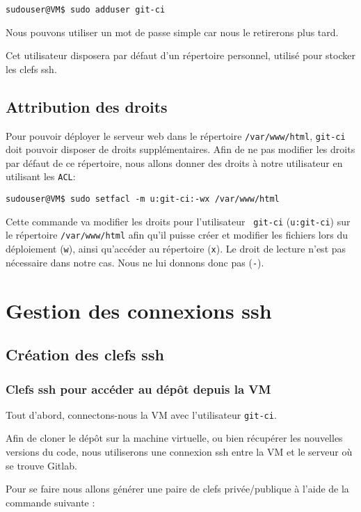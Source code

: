     \begin{verbatim}
sudouser@VM$ sudo adduser git-ci
    \end{verbatim}

Nous pouvons utiliser un mot de passe simple car nous le retirerons plus tard.

Cet utilisateur disposera par défaut d'un répertoire personnel, utilisé pour stocker les clefs ssh.

\subsection{Attribution des droits}
Pour pouvoir déployer le serveur web dans le répertoire \texttt{/var/www/html}, \texttt{git-ci} doit pouvoir disposer de droits supplémentaires.
Afin de ne pas modifier les droits par défaut de ce répertoire, nous allons donner des droits à notre utilisateur en utilisant les \texttt{ACL}:

    \begin{verbatim}
sudouser@VM$ sudo setfacl -m u:git-ci:-wx /var/www/html
    \end{verbatim}

Cette commande va modifier les droits pour l'utilisateur  \texttt{git-ci} (\texttt{u:git-ci}) sur le répertoire \texttt{/var/www/html} afin qu'il puisse créer et modifier les fichiers lors du déploiement (\texttt{w}), ainsi qu'accéder au répertoire (\texttt{x}). Le droit de lecture n'est pas nécessaire dans notre cas. Nous ne lui donnons donc pas (\texttt{-}).

\section{Gestion des connexions ssh}
\subsection{Création des clefs ssh}
\subsubsection{Clefs ssh pour accéder au dépôt depuis la VM}
Tout d'abord, connectons-nous la VM avec l'utilisateur \texttt{git-ci}.

Afin de cloner le dépôt sur la machine virtuelle, ou bien récupérer les nouvelles versions du code, nous utiliserons une connexion ssh entre la VM et le serveur où se trouve Gitlab.

Pour se faire nous allons générer une paire de clefs privée/publique à l'aide de la commande suivante :

